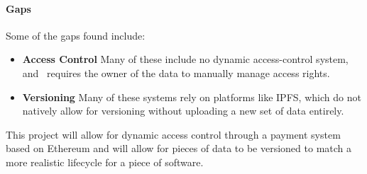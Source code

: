 \paragraph*{Gaps}
Some of the gaps found include:
\begin{itemize}
  \item \textbf{Access Control} Many of these include no dynamic access-control system, and~\cite{wang_blockchain-based_2018} requires the owner of the data to manually manage access rights. 
  \item \textbf{Versioning} Many of these systems rely on platforms like IPFS, which do not natively allow for versioning without uploading a new set of data entirely.
\end{itemize}

\newparagraph
This project will allow for dynamic access control through a payment system based on Ethereum and will allow for pieces of data to be versioned to match a more realistic lifecycle for a piece of software.
